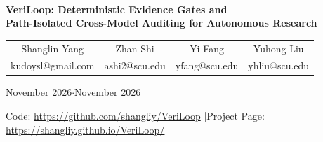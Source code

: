 \documentclass[10pt]{article}
\makeatletter
\newcommand{\PaperAuthors}{%
  \begin{tabular}[t]{c@{\hspace{1.8em}}c@{\hspace{1.8em}}c@{\hspace{1.8em}}c}
    Shanglin Yang & Zhan Shi & Yi Fang & Yuhong Liu \\
    {\footnotesize\ttfamily\color{slate} kudoysl@gmail.com} &
    {\footnotesize\ttfamily\color{slate} ashi2@scu.edu} &
    {\footnotesize\ttfamily\color{slate} yfang@scu.edu} &
    {\footnotesize\ttfamily\color{slate} yhliu@scu.edu}
  \end{tabular}%
}
\newcommand{\PaperAffiliation}{}
\newcommand{\PaperDate}{November 2026}
\newcommand{\PaperRepoURL}{https://github.com/shangliy/VeriLoop}
\newcommand{\PaperPageURL}{https://shangliy.github.io/VeriLoop/}
\makeatother
\begin{document}
\thispagestyle{plain}

\noindent{\color{navy}\rule{\linewidth}{2.0pt}}\\[8pt]
\begin{center}
  {\Large\sffamily\bfseries\color{navy} VeriLoop: Deterministic Evidence Gates and\\
  Path-Isolated Cross-Model Auditing for Autonomous Research\par}
  \vspace{10pt}
  {\normalsize\sffamily \PaperAuthors\par}
  \vspace{3pt}
  {\small\sffamily\color{slate}\if\relax\detokenize\expandafter{\PaperAffiliation}\relax\PaperDate\else\PaperAffiliation \quad$\cdot$\quad \PaperDate\fi\par}
  \vspace{5pt}
  {\footnotesize\ttfamily\color{navy} Code: \href{\PaperRepoURL}{\PaperRepoURL} \quad|\quad Project Page: \href{\PaperPageURL}{\PaperPageURL}\par}
\end{center}
\vspace{-2pt}
\noindent{\color{rulegray}\rule{\linewidth}{0.6pt}}
\vspace{6pt}













\clearpage
\appendix

\end{document}
